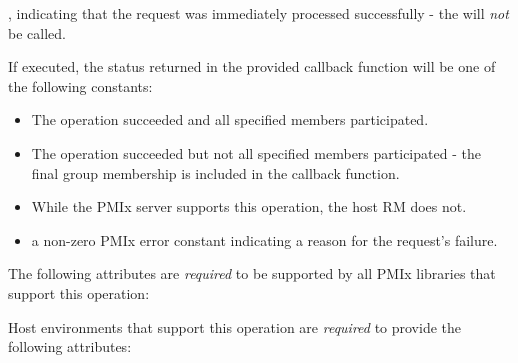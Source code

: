 \begin{arglist}
\end{arglist}

\returnsimplenb

\returnstart
\begin{constantdesc}
\item {}, indicating that the request was immediately processed successfully - the  will \textit{not} be called.
\end{constantdesc}
\returnend

If executed, the status returned in the provided callback function will be one of the following constants:

\begin{itemize}
\item {} The operation succeeded and all specified members participated.
\item {} The operation succeeded but not all specified members participated - the final group membership is included in the callback function.
\item {} While the \ac{PMIx} server supports this operation, the host \ac{RM} does not.
\item a non-zero \ac{PMIx} error constant indicating a reason for the request's failure.
\end{itemize}

\reqattrstart
The following attributes are \textit{required} to be supported by all \ac{PMIx} libraries that support this operation:


Host environments that support this operation are \textit{required} to provide the following attributes:

